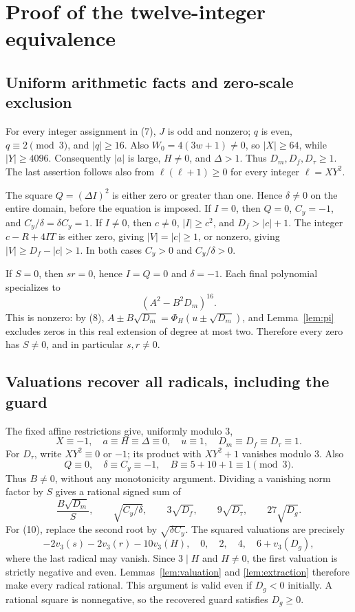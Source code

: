 \documentclass[11pt,letterpaper]{article}
\theoremstyle{definition}\newtheorem{definition}[theorem]{Definition}
\theoremstyle{remark}\newtheorem{remark}[theorem]{Remark}
\newcommand{\val}{v_3}\newcommand{\topf}[1]{{#1}_{\mathrm{top}}}
\begin{document}
\section{Proof of the twelve-integer equivalence}
\subsection{Uniform arithmetic facts and zero-scale exclusion}
For every integer assignment in (7), $J$ is odd and nonzero; $q$ is even, $q\equiv2\pmod3$, and $|q|\ge16$. Also $W_0=4(3w+1)\ne0$, so $|X|\ge64$, while $|Y|\ge4096$. Consequently $|a|$ is large, $H\ne0$, and $\Delta>1$. Thus $D_m,D_f,D_\tau\ge1$. The last assertion follows also from $\ell(\ell+1)\ge0$ for every integer $\ell=XY^2$.

The square $Q=(\Delta I)^2$ is either zero or greater than one. Hence $\delta\ne0$ on the entire domain, before the equation is imposed. If $I=0$, then $Q=0$, $C_y=-1$, and $C_y/\delta=\delta C_y=1$. If $I\ne0$, then $c\ne0$, $|I|\ge c^2$, and $D_f>|c|+1$. The integer $c-R+4IT$ is either zero, giving $|V|=|c|\ge1$, or nonzero, giving $|V|\ge D_f-|c|>1$. In both cases $C_y>0$ and $C_y/\delta>0$.

If $S=0$, then $sr=0$, hence $I=Q=0$ and $\delta=-1$. Each final polynomial specializes to
\[
 (A^2-B^2D_m)^{16}.
\]
This is nonzero: by (8), $A\pm B\sqrt{D_m}=\Phi_H(u\pm\sqrt{D_m})$, and Lemma~\ref{lem:pi} excludes zeros in this real extension of degree at most two. Therefore every zero has $S\ne0$, and in particular $s,r\ne0$.

\subsection{Valuations recover all radicals, including the guard}
The fixed affine restrictions give, uniformly modulo $3$,
\[
 X\equiv-1,\quad a\equiv H\equiv\Delta\equiv0,
 \quad u\equiv1,\quad D_m\equiv D_f\equiv D_\tau\equiv1.
\]
For $D_\tau$, write $XY^2\equiv0$ or $-1$; its product with $XY^2+1$ vanishes modulo $3$. Also
\[
 Q\equiv0,\quad \delta\equiv C_y\equiv-1,
 \quad B\equiv5+10+1\equiv1\pmod3.
\]
Thus $B\ne0$, without any monotonicity argument. Dividing a vanishing norm factor by $S$ gives a rational signed sum of
\[
 \frac{B\sqrt{D_m}}{S},\qquad
 \sqrt{C_y/\delta},\qquad
 3\sqrt{D_f},\qquad9\sqrt{D_\tau},\qquad27\sqrt{D_g}.
 \tag{11}\label{eq:roots12}
\]
For (10), replace the second root by $\sqrt{\delta C_y}$. The squared valuations are precisely
\[
 -2\val(s)-2\val(r)-10\val(H),\quad0,\quad2,\quad4,
 \quad 6+\val(D_g),
\]
where the last radical may vanish. Since $3\mid H$ and $H\ne0$, the first valuation is strictly negative and even. Lemmas~\ref{lem:valuation} and \ref{lem:extraction} therefore make every radical rational. This argument is valid even if $D_g<0$ initially. A rational square is nonnegative, so the recovered guard satisfies $D_g\ge0$.
\end{document}
